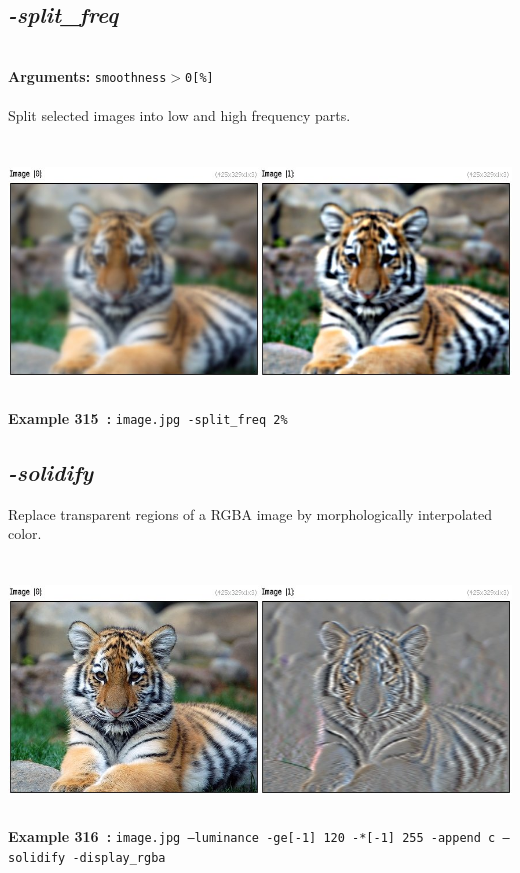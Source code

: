 \documentclass[a4paper,11pt,twoside]{book}
\begin{document}
\subsection{\emph{-split\_freq} }\vspace*{-0.5em}
~\\\textbf{Arguments: } 
{\small \texttt{smoothness$>$0[\%]}}\\~\\
Split selected images into low and high frequency parts.
\begin{center}\includegraphics[keepaspectratio=true,height=7cm,width=\textwidth]{img/gmic_def315.jpg}\\
{\footnotesize \textbf{Example 315~:} \texttt{image.jpg -split\_freq 2\%}}
\end{center}

\subsection{\emph{-solidify} }\vspace*{-0.5em}
Replace transparent regions of a RGBA image by morphologically interpolated color.
\begin{center}\includegraphics[keepaspectratio=true,height=7cm,width=\textwidth]{img/gmic_def316.jpg}\\
{\footnotesize \textbf{Example 316~:} \texttt{image.jpg --luminance -ge[-1] 120 -*[-1] 255 -append c --solidify -display\_rgba}}
\end{center}
\end{document}
